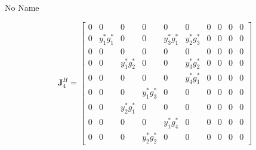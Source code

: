 \documentclass[a4paper,10pt]{article}
\begin{document}
\begin{section}{No Name}
\begin{landscape}
\begin{equation}
\end{equation}
\begin{equation}
\boldsymbol{J}_4^H = 
\begin{bmatrix}
0&0&0&0&0&0&0&0&0&0\\
0&y_1^*g_1^*&0&0&y_3^*g_1^*&y_2^*g_3^*&0&0&0&0\\
0&0&0&0&0&0&0&0&0&0\\
0&0&y_1^*g_2^*&0&0&y_3^*g_2^*&0&0&0&0\\
0&0&0&0&0&y_4^*g_1^*&0&0&0&0\\
0&0&0&y_1^*g_3^*&0&0&0&0&0&0\\
0&0&y_2^*g_1^*&0&0&0&0&0&0&0\\
0&0&0&0&y_1^*g_4^*&0&0&0&0&0\\
0&0&0&y_2^*g_2^*&0&0&0&0&0&0
\end{bmatrix}
\end{equation}
\end{landscape}


\end{section}
\end{document}
